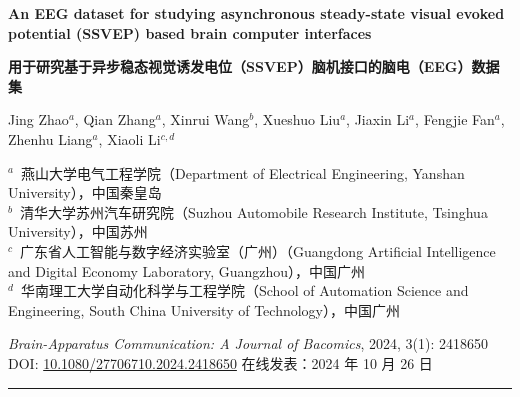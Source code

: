 \documentclass[11pt]{ctexart}
\title{}
\author{}
\date{}
\begin{document}
\begin{center}
{\LARGE\bfseries An EEG dataset for studying asynchronous steady-state visual evoked potential (SSVEP) based brain computer interfaces\par}
\vspace{6pt}
{\Large\bfseries 用于研究基于异步稳态视觉诱发电位（SSVEP）脑机接口的脑电（EEG）数据集\par}
\vspace{10pt}
{\normalsize Jing Zhao$^{a}$, Qian Zhang$^{a}$, Xinrui Wang$^{b}$, Xueshuo Liu$^{a}$, Jiaxin Li$^{a}$, Fengjie Fan$^{a}$, Zhenhu Liang$^{a}$, Xiaoli Li$^{c,d}$\par}
\vspace{4pt}
{\small
$^{a}$~燕山大学电气工程学院（Department of Electrical Engineering, Yanshan University），中国秦皇岛\\
$^{b}$~清华大学苏州汽车研究院（Suzhou Automobile Research Institute, Tsinghua University），中国苏州\\
$^{c}$~广东省人工智能与数字经济实验室（广州）（Guangdong Artificial Intelligence and Digital Economy Laboratory, Guangzhou），中国广州\\
$^{d}$~华南理工大学自动化科学与工程学院（School of Automation Science and Engineering, South China University of Technology），中国广州\par}
\vspace{8pt}
{\small \textit{Brain-Apparatus Communication: A Journal of Bacomics}, 2024, 3(1): 2418650\\
DOI: \href{https://doi.org/10.1080/27706710.2024.2418650}{10.1080/27706710.2024.2418650} \quad 在线发表：2024 年 10 月 26 日\par}
\end{center}

\vspace{2pt}
\noindent\textcolor{gray}{\rule{\textwidth}{0.4pt}}
\vspace{2pt}

\end{document}
